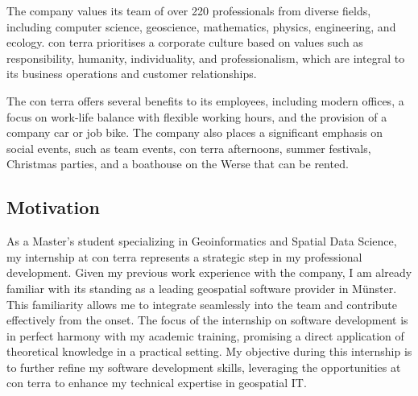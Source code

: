 \documentclass[11pt, titlepage, a4paper]{article}
\begin{document}
The company values its team of over 220 professionals from diverse fields, including computer science, geoscience, mathematics, physics, engineering, and ecology. con terra prioritises a corporate culture based on values such as responsibility, humanity, individuality, and professionalism, which are integral to its business operations and customer relationships.




The con terra offers several benefits to its employees, including modern offices, a focus on work-life balance with flexible working hours, and the provision of a company car or job bike. The company also places a significant emphasis on social events, such as team events, con terra afternoons, summer festivals, Christmas parties, and a boathouse on the Werse that can be rented\cite{conterraUnternehmensubersicht2024}.





\subsection{Motivation}
As a Master’s student specializing in Geoinformatics and Spatial Data Science, my internship at con terra represents a strategic step in my professional development. Given my previous work experience with the company, I am already familiar with its standing as a leading geospatial software provider in Münster. This familiarity allows me to integrate seamlessly into the team and contribute effectively from the onset. The focus of the internship on software development is in perfect harmony with my academic training, promising a direct application of theoretical knowledge in a practical setting. My objective during this internship is to further refine my software development skills, leveraging the opportunities at con terra to enhance my technical expertise in geospatial IT.
\end{document}
